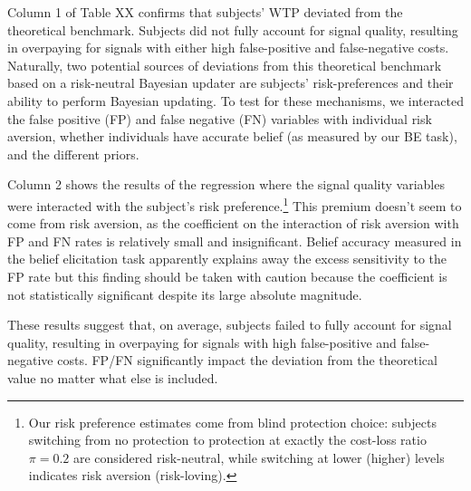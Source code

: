 \documentclass[12pt,a4paper]{article}
\begin{document}





Column 1 of Table XX confirms that subjects’ WTP deviated from the theoretical benchmark. Subjects did not fully account for signal quality, resulting in overpaying for signals with either high false-positive and false-negative costs. Naturally, two potential sources of deviations from this theoretical benchmark based on a risk-neutral Bayesian updater are subjects’ risk-preferences and their ability to perform Bayesian updating. To test for these mechanisms, we interacted the false positive (FP) and false negative (FN) variables with individual risk aversion, whether individuals have accurate belief (as measured by our BE task), and the different priors.

Column 2 shows the results of the regression where the signal quality variables were interacted with the subject’s risk preference.\footnote{Our risk preference estimates come from blind protection choice: subjects switching from no protection to protection at exactly the cost-loss ratio $\pi=0.2$ are considered risk-neutral, while switching at lower (higher) levels indicates risk aversion (risk-loving).} This premium doesn’t seem to come from risk aversion, as the coefficient on the interaction of risk aversion with FP and FN rates is relatively small and insignificant. Belief accuracy measured in the belief elicitation task apparently explains away the excess sensitivity to the FP rate but this finding should be taken with caution because the coefficient is not statistically significant despite its large absolute magnitude.

These results suggest that, on average, subjects failed to fully account for signal quality, resulting in overpaying for signals with high false-positive and false-negative costs.  FP/FN significantly impact the deviation from the theoretical value no matter what else is included.  
\end{document}
